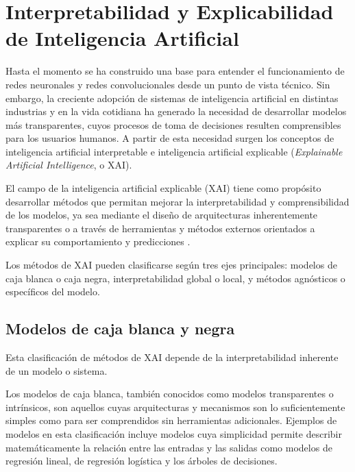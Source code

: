 \section{Interpretabilidad y Explicabilidad de Inteligencia Artificial}
Hasta el momento se ha construido una base para entender el funcionamiento de redes neuronales y redes 
convolucionales desde un punto de vista técnico. Sin embargo, la creciente adopción de sistemas de 
inteligencia artificial en distintas industrias y en la vida cotidiana ha generado la necesidad de 
desarrollar modelos más transparentes, cuyos procesos de toma de decisiones resulten comprensibles para 
los usuarios humanos. A partir de esta necesidad surgen los conceptos de inteligencia artificial interpretable
 e inteligencia artificial explicable (\textit{Explainable Artificial Intelligence}, o XAI).
\medskip

El campo de la inteligencia artificial explicable (XAI) tiene como propósito desarrollar métodos que 
permitan mejorar la interpretabilidad y comprensibilidad de los modelos, ya sea mediante el diseño de 
arquitecturas inherentemente transparentes o a través de herramientas y métodos externos orientados a 
explicar su comportamiento y predicciones \parencite{arrieta2020explainable}.
\medskip

Los métodos de XAI pueden clasificarse según tres ejes principales: modelos de caja blanca o caja negra, 
interpretabilidad global o local, y métodos agnósticos o específicos del modelo.

\subsection{Modelos de caja blanca y negra}
Esta clasificación de métodos de XAI depende de la interpretabilidad inherente de un modelo o sistema.
\medskip

Los modelos de caja blanca, también conocidos como modelos transparentes o intrínsicos, son aquellos cuyas 
arquitecturas y mecanismos son lo suficientemente simples como para ser comprendidos sin herramientas 
adicionales. Ejemplos de modelos en esta clasificación incluye modelos cuya simplicidad permite describir 
matemáticamente la relación  entre las entradas y las salidas como modelos de regresión lineal, de 
regresión logística y los árboles de decisiones.
\medskip

